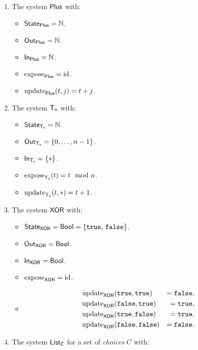 \documentclass[DynamicalBook]{subfiles}
\begin{document}
\begin{exercise}
  \begin{enumerate}
  \item The system $\mathsf{Plus}$ with:
    \begin{itemize}
    \item $\mathsf{State}_{\mathsf{Plus}} = \mathbb{N}$.
    \item $\mathsf{Out}_{\mathsf{Plus}} = \mathbb{N}$.
    \item $\mathsf{In}_{\mathsf{Plus}} = \mathbb{N}$.
    \item $\mathrm{expose}_{\mathsf{Plus}} = \mathrm{id}$.
    \item $\mathrm{update}_{\mathsf{Plus}}(t, j) = t + j$.
    \end{itemize}
  \item The system $\mathsf{T_n}$ with:
    \begin{itemize}
    \item $\mathsf{State}_{\mathsf{T_n}} = \mathbb{N}$.
    \item $\mathsf{Out}_{\mathsf{T_n}} = \{0, \ldots, n - 1\}$.
    \item $\mathsf{In}_{\mathsf{T_n}} = \{\ast\}$.
    \item $\mathrm{expose}_{\mathsf{T_n}}(t) = t \mod n$.
    \item $\mathrm{update}_{\mathsf{T_n}}(t, \ast) = t + 1$.
    \end{itemize}
  \item The system $\mathsf{XOR}$ with:
    \begin{itemize}
    \item $\mathsf{State}_{\mathsf{XOR}} = \mathsf{Bool} = \{\mathtt{true},\, \mathtt{false}\}$.
    \item $\mathsf{Out}_{\mathsf{XOR}} = \mathsf{Bool}$.
    \item $\mathsf{In}_{\mathsf{XOR}} = \mathsf{Bool}$.
    \item $\mathrm{expose}_{\mathsf{XOR}} = \mathrm{id}$.
    \item \[\begin{aligned}
        &\mathrm{update}_{\mathsf{XOR}}(\mathtt{true}, \mathtt{true}) &= \mathtt{false}, \\
        &\mathrm{update}_{\mathsf{XOR}}(\mathtt{false}, \mathtt{true}) &= \mathtt{true}, \\
        &\mathrm{update}_{\mathsf{XOR}}(\mathtt{true}, \mathtt{false}) &= \mathtt{true}, \\
        &\mathrm{update}_{\mathsf{XOR}}(\mathtt{false}, \mathtt{false}) &= \mathtt{false}.
          \end{aligned}\]
    \end{itemize}
  \item The system $\mathsf{List_C}$ for a set of \emph{choices} $C$ with:

\end{enumerate}
\end{exercise}
\end{document}
